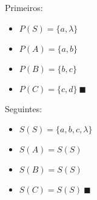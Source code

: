  {
	Primeiros:
	\begin{itemize}
		\item $P(S) = \{a, \lambda\}$
		\item $P(A) = \{a, b\}$
		\item $P(B) = \{b, c\}$
		\item $P(C) = \{c, d\}\ \blacksquare$
	\end{itemize}

	Seguintes:
	\begin{itemize}
		\item $S(S) = \{a, b, c, \lambda\}$
		\item $S(A) = S(S)$
		\item $S(B) = S(S)$
		\item $S(C) = S(S)\ \blacksquare$
	\end{itemize}

}


